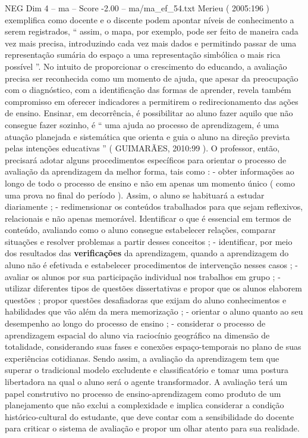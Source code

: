 \begin{textsample}{NEG Dim 4 – ma – Score -2.00 – ma/ma\_ef\_54.txt}
Merieu ( 2005:196 ) exemplifica como docente e o discente podem apontar níveis de conhecimento a serem registrados, “ assim, o mapa, por exemplo, pode ser feito de maneira cada vez mais precisa, introduzindo cada vez mais dados e permitindo passar de uma representação sumária do espaço a uma representação simbólica o mais rica possível ”.
No intuito de proporcionar o crescimento do educando, a avaliação precisa ser reconhecida como um momento de ajuda, que apesar da preocupação com o diagnóstico, com a identificação das formas de aprender, revela também compromisso em oferecer indicadores a permitirem o redirecionamento das ações de ensino.
Ensinar, em decorrência, é possibilitar ao aluno fazer aquilo que não consegue fazer sozinho, é “ uma ajuda ao processo de aprendizagem, é uma atuação planejada e sistemática que orienta e guia o aluno na direção prevista pelas intenções educativas ” ( GUIMARÃES, 2010:99 ).
O professor, então, precisará adotar alguns procedimentos específicos para orientar o processo de avaliação da aprendizagem da melhor forma, tais como : - obter informações ao longo de todo o processo de ensino e não em apenas um momento único ( como uma prova no final do período ).
Assim, o aluno se habituará a estudar diariamente ; - redimensionar os conteúdos trabalhados para que sejam reflexivos, relacionais e não apenas memorável.
Identificar o que é essencial em termos de conteúdo, avaliando como o aluno consegue estabelecer relações, comparar situações e resolver problemas a partir desses conceitos ; - identificar, por meio dos resultados das \textbf{verificações} da aprendizagem, quando a aprendizagem do aluno não é efetivada e estabelecer procedimentos de intervenção nesses casos ; - avaliar os alunos por sua participação individual nos trabalhos em grupo ; - utilizar diferentes tipos de questões dissertativas e propor que os alunos elaborem questões ; propor questões desafiadoras que exijam do aluno conhecimentos e habilidades que vão além da mera memorização ; - orientar o aluno quanto ao seu desempenho ao longo do processo de ensino ; - considerar o processo de aprendizagem espacial do aluno via raciocínio geográfico na dimensão de totalidade, considerando suas fases e conexões espaço-temporais no plano de suas experiências cotidianas.
Sendo assim, a avaliação da aprendizagem tem que superar o tradicional modelo excludente e classificatório e tomar uma postura libertadora na qual o aluno será o agente transformador.
A avaliação terá um papel construtivo no processo de ensino-aprendizagem como produto de um planejamento que não exclui a complexidade e implica considerar a condição histórico-cultural do estudante, que deve contar com a sensibilidade do docente para criticar o sistema de avaliação e propor um olhar atento para sua realidade.

\end{textsample}
